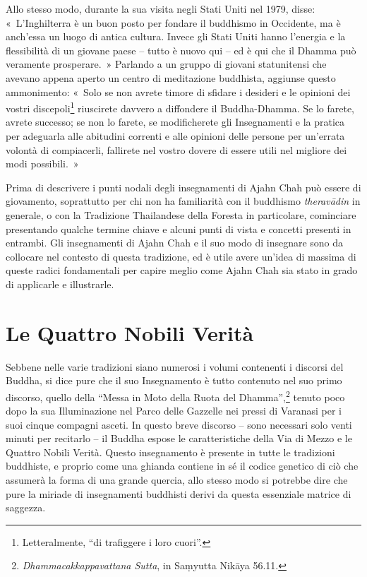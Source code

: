 Allo stesso modo, durante la sua visita negli Stati Uniti nel 1979,
disse: «~L'Inghilterra è un buon posto per fondare il buddhismo in
Occidente, ma è anch'essa un luogo di antica cultura. Invece gli Stati
Uniti hanno l'energia e la flessibilità di un giovane paese -- tutto è
nuovo qui -- ed è qui che il Dhamma può veramente prosperare.~» Parlando
a un gruppo di giovani statunitensi che avevano appena aperto un centro
di meditazione buddhista, aggiunse questo ammonimento: «~Solo se non
avrete timore di sfidare i desideri e le opinioni dei vostri
discepoli\footnote{Letteralmente, ``di trafiggere i loro cuori''.}
riuscirete davvero a diffondere il Buddha-Dhamma. Se lo farete, avrete
successo; se non lo farete, se modificherete gli Insegnamenti e la
pratica per adeguarla alle abitudini correnti e alle opinioni delle
persone per un'errata volontà di compiacerli, fallirete nel vostro
dovere di essere utili nel migliore dei modi possibili.~»

Prima di descrivere i punti nodali degli insegnamenti di Ajahn Chah può
essere di giovamento, soprattutto per chi non ha familiarità con il
buddhismo \emph{theravādin} in generale, o con la Tradizione Thailandese
della Foresta in particolare, cominciare presentando qualche termine
chiave e alcuni punti di vista e concetti presenti in entrambi. Gli
insegnamenti di Ajahn Chah e il suo modo di insegnare sono da collocare
nel contesto di questa tradizione, ed è utile avere un'idea di massima
di queste radici fondamentali per capire meglio come Ajahn Chah sia
stato in grado di applicarle e illustrarle.

\section{Le Quattro Nobili Verità}

Sebbene nelle varie tradizioni siano numerosi i volumi contenenti i
discorsi del Buddha, si dice pure che il suo Insegnamento è tutto
contenuto nel suo primo discorso, quello della ``Messa in Moto della
Ruota del Dhamma'',\footnote{\emph{Dhammacakkappavattana Sutta}, in
  Saṃyutta Nikāya 56.11.} tenuto poco dopo la sua Illuminazione
nel Parco delle Gazzelle nei pressi di Varanasi per i suoi cinque
compagni asceti. In questo breve discorso -- sono necessari solo venti
minuti per recitarlo -- il Buddha espose le caratteristiche della Via di
Mezzo e le Quattro Nobili Verità. Questo insegnamento è presente in
tutte le tradizioni buddhiste, e proprio come una ghianda contiene in sé
il codice genetico di ciò che assumerà la forma di una grande quercia,
allo stesso modo si potrebbe dire che pure la miriade di insegnamenti
buddhisti derivi da questa essenziale matrice di saggezza.

